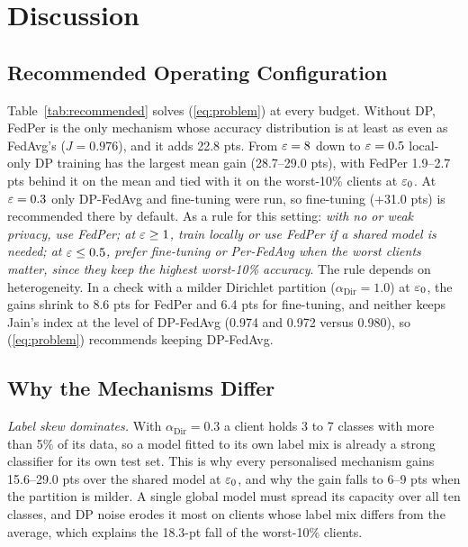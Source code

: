 \section{Discussion}\label{sec:discussion}

\subsection{Recommended Operating Configuration}
Table~\ref{tab:recommended} solves (\ref{eq:problem}) at every budget. Without DP, FedPer is the only mechanism whose
accuracy distribution is at least as even as FedAvg's ($J=0.976$), and it adds 22.8 pts. From $\varepsilon=8$ down to
$\varepsilon=0.5$ local-only DP training has the largest mean gain (28.7--29.0 pts), with FedPer 1.9--2.7 pts behind it on
the mean and tied with it on the worst-10\% clients at $\varepsilon_0$. At $\eps=0.3$ only DP-FedAvg and fine-tuning were
run, so fine-tuning (+31.0 pts) is recommended there by default. As a rule for this setting: \emph{with no or weak
privacy, use FedPer; at $\varepsilon\ge1$, train locally or use FedPer if a shared model is needed; at $\varepsilon\le0.5$, prefer
fine-tuning or Per-FedAvg when the worst clients matter, since they keep the highest worst-10\% accuracy}. The rule
depends on heterogeneity. In a check with a milder Dirichlet partition ($\alpha_{\mathrm{Dir}}=1.0$) at $\varepsilon_0$, the
gains shrink to 8.6 pts for FedPer and 6.4 pts for fine-tuning, and neither keeps Jain's index at the level of
DP-FedAvg (0.974 and 0.972 versus 0.980), so (\ref{eq:problem}) recommends keeping DP-FedAvg.

\begin{table}[!t]
\caption{Recommended configuration per budget on CIFAR-10 ($\alpha_{\mathrm{Dir}}=0.3$): the mechanism with the
largest mean gain whose Jain index is at least that of DP-FedAvg ($J_0$), i.e. the solution of (\ref{eq:problem}).
At $\eps=0.3$ only DP-FedAvg and fine-tuning were run.}
\label{tab:recommended}
\centering
\footnotesize
{}
\end{table}

\subsection{Why the Mechanisms Differ}
\emph{Label skew dominates.} With $\alpha_{\mathrm{Dir}}=0.3$ a client holds 3 to 7 classes with more than 5\% of its
data, so a model fitted to its own label mix is already a strong classifier for its own test set. This is why every
personalised mechanism gains 15.6--29.0 pts over the shared model at $\varepsilon_0$, and why the gain falls to 6--9 pts when
the partition is milder. A single global model must spread its capacity over all ten classes, and DP noise erodes it
most on clients whose label mix differs from the average, which explains the 18.3-pt fall of the worst-10\% clients.

